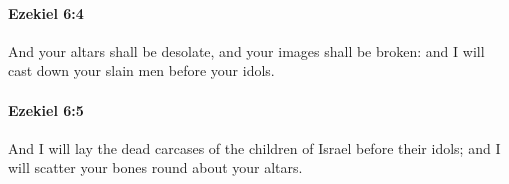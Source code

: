 		\paragraph{Ezekiel 6:4} %
			\label{EZEKIEL-6-4}

			And your altars shall be desolate, and your images shall be broken: and I will cast down your slain men before your idols.


		\paragraph{Ezekiel 6:5} %
			\label{EZEKIEL-6-5}

			And I will lay the dead carcases of the children of Israel before their idols; and I will scatter your bones round about your altars.


